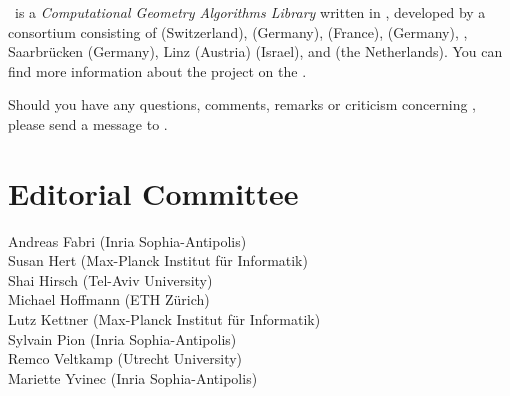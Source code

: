
\cgal\ is a {\em Computational Geometry Algorithms Library} written in \CC, 
developed by a consortium consisting of
 (Switzerland), 
 (Germany), 
 (France),
 (Germany),
,
Saarbr\"ucken (Germany),
 Linz (Austria)
 (Israel), and
 (the Netherlands). 
You can find more information about the project on the
.


Should you have any questions, comments, remarks or criticism concerning 
\cgal, please send a message to 
.

\section*{Editorial Committee}

Andreas Fabri ({\sc Inria} Sophia-Antipolis) \\
Susan Hert (Max-Planck Institut f\"ur Informatik)\\
Shai Hirsch (Tel-Aviv University) \\
Michael Hoffmann (ETH Z\"urich) \\
Lutz Kettner (Max-Planck Institut f\"ur Informatik)\\
Sylvain Pion ({\sc Inria} Sophia-Antipolis)\\
Remco Veltkamp (Utrecht University)\\
Mariette Yvinec ({\sc Inria} Sophia-Antipolis)\\



